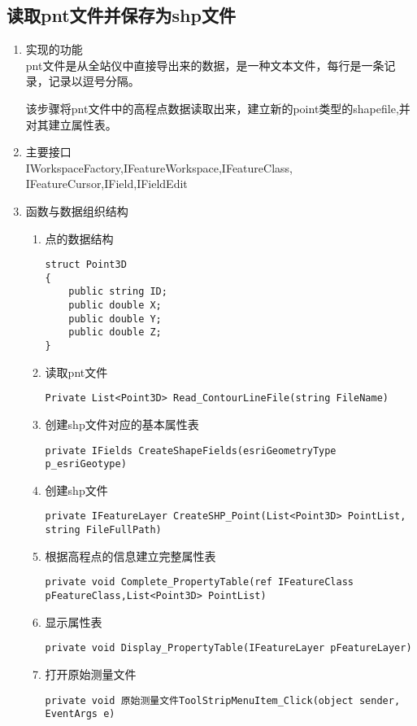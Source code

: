 \documentclass[twoside,color=blue,mathpazo,titlestyle=hang,12pt]{elegantbook}
\numberwithin{equation}{section}
\begin{document}
\subsection{读取pnt文件并保存为shp文件} 
\begin{enumerate}
\item 实现的功能\\
pnt文件是从全站仪中直接导出来的数据，是一种文本文件，每行是一条记录，记录以逗号分隔。

该步骤将pnt文件中的高程点数据读取出来，建立新的point类型的shapefile,并对其建立属性表。
\item 主要接口\\
IWorkspaceFactory,IFeatureWorkspace,IFeatureClass, IFeatureCursor,IField,IFieldEdit
\item 函数与数据组织结构
\begin{enumerate}
\item 点的数据结构
\begin{lstlisting}
struct Point3D
{
    public string ID;
    public double X;
    public double Y;
    public double Z;
}
\end{lstlisting}
\item 读取pnt文件
\begin{lstlisting}
Private List<Point3D> Read_ContourLineFile(string FileName) 
\end{lstlisting}
\item 创建shp文件对应的基本属性表
\begin{lstlisting}
private IFields CreateShapeFields(esriGeometryType p_esriGeotype)
\end{lstlisting}
\item 创建shp文件
\begin{lstlisting}
private IFeatureLayer CreateSHP_Point(List<Point3D> PointList, string FileFullPath)
\end{lstlisting}
\item 根据高程点的信息建立完整属性表
\begin{lstlisting}
private void Complete_PropertyTable(ref IFeatureClass  pFeatureClass,List<Point3D> PointList)
\end{lstlisting}
\item 显示属性表
\begin{lstlisting}
private void Display_PropertyTable(IFeatureLayer pFeatureLayer)
\end{lstlisting}
\item 打开原始测量文件
\begin{lstlisting}
private void 原始测量文件ToolStripMenuItem_Click(object sender, EventArgs e)
\end{lstlisting}
\end{enumerate}
\end{enumerate}
\end{document}
